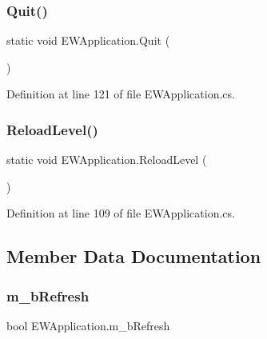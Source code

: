 \mbox{\label{class_e_w_application_ae161cefbe0c88b3c72b3acb3ef5686c7}} 
\subsubsection{\texorpdfstring{Quit()}{Quit()}}
{\footnotesize\ttfamily static void E\+W\+Application.\+Quit (\begin{DoxyParamCaption}{ }\end{DoxyParamCaption})\hspace{0.3cm}{\ttfamily [static]}}



Definition at line 121 of file E\+W\+Application.\+cs.

\mbox{\label{class_e_w_application_a88c9fd7e1cb550fee5e2cc048ed08f77}} 
\subsubsection{\texorpdfstring{Reload\+Level()}{ReloadLevel()}}
{\footnotesize\ttfamily static void E\+W\+Application.\+Reload\+Level (\begin{DoxyParamCaption}{ }\end{DoxyParamCaption})\hspace{0.3cm}{\ttfamily [static]}}



Definition at line 109 of file E\+W\+Application.\+cs.



\subsection{Member Data Documentation}
\mbox{\label{class_e_w_application_a172703f8962f0aee398c21d98b037e59}} 
\subsubsection{\texorpdfstring{m\+\_\+b\+Refresh}{m\_bRefresh}}
{\footnotesize\ttfamily bool E\+W\+Application.\+m\+\_\+b\+Refresh}




